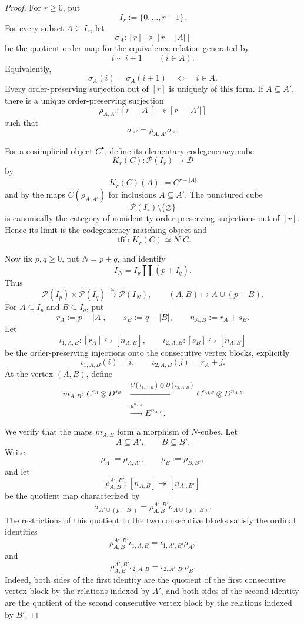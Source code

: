 \begin{proof}
For \(r\geq0\), put
\[
    I_r:=\{0,\ldots,r-1\}.
\]
For every subset \(A\subseteq I_r\), let
\[
    \sigma_A:[r]\twoheadrightarrow[r-|A|]
\]
be the quotient order map for the equivalence relation generated by
\[
    i\sim i+1
    \qquad(i\in A).
\]
Equivalently,
\[
    \sigma_A(i)=\sigma_A(i+1)
    \quad\Longleftrightarrow\quad
    i\in A.
\]
Every order-preserving surjection out of \([r]\) is uniquely of this form.
If \(A\subseteq A'\), there is a unique order-preserving surjection
\[
    \rho_{A,A'}:
    [r-|A|]\twoheadrightarrow[r-|A'|]
\]
such that
\[
\boxed{
    \sigma_{A'}
    =
    \rho_{A,A'}\sigma_A.
}
\]

For a cosimplicial object \(C^\bullet\), define its elementary codegeneracy
cube
\[
    K_r(C):\mathcal P(I_r)\longrightarrow\mathcal D
\]
by
\[
    K_r(C)(A):=C^{r-|A|}
\]
and by the maps \(C(\rho_{A,A'})\) for inclusions \(A\subseteq A'\).
The punctured cube
\[
    \mathcal P(I_r)\setminus\{\varnothing\}
\]
is canonically the category of nonidentity order-preserving surjections out of
\([r]\).  Hence its limit is the codegeneracy matching object and
\[
\boxed{
    \operatorname{tfib}K_r(C)
    \simeq
    N^rC.
}
\]

Now fix \(p,q\geq0\), put \(N=p+q\), and identify
\[
    I_N
    =
    I_p\amalg(p+I_q).
\]
Thus
\[
    \mathcal P(I_p)\times\mathcal P(I_q)
    \xrightarrow{\simeq}
    \mathcal P(I_N),
    \qquad
    (A,B)\longmapsto A\cup(p+B).
\]
For \(A\subseteq I_p\) and \(B\subseteq I_q\), put
\[
    r_A:=p-|A|,
    \qquad
    s_B:=q-|B|,
    \qquad
    n_{A,B}:=r_A+s_B.
\]
Let
\[
    \iota_{1,A,B}:[r_A]\hookrightarrow[n_{A,B}],
    \qquad
    \iota_{2,A,B}:[s_B]\hookrightarrow[n_{A,B}]
\]
be the order-preserving injections onto the consecutive vertex blocks,
explicitly
\[
    \iota_{1,A,B}(i)=i,
    \qquad
    \iota_{2,A,B}(j)=r_A+j.
\]
At the vertex \((A,B)\), define
\[
\begin{aligned}
    m_{A,B}:\,
    C^{r_A}\otimes D^{s_B}
    &\xrightarrow{
        C(\iota_{1,A,B})
        \otimes
        D(\iota_{2,A,B})
    }
    C^{n_{A,B}}\otimes D^{n_{A,B}}
    \\
    &\xrightarrow{\mu^{n_{A,B}}}
    E^{n_{A,B}}.
\end{aligned}
\]

We verify that the maps \(m_{A,B}\) form a morphism of \(N\)-cubes.  Let
\[
    A\subseteq A',
    \qquad
    B\subseteq B'.
\]
Write
\[
    \rho_A:=\rho_{A,A'},
    \qquad
    \rho_B:=\rho_{B,B'},
\]
and let
\[
    \rho_{A,B}^{A',B'}:
    [n_{A,B}]
    \twoheadrightarrow
    [n_{A',B'}]
\]
be the quotient map characterized by
\[
    \sigma_{A'\cup(p+B')}
    =
    \rho_{A,B}^{A',B'}
    \sigma_{A\cup(p+B)}.
\]
The restrictions of this quotient to the two consecutive blocks satisfy the
ordinal identities
\[
\boxed{
    \rho_{A,B}^{A',B'}\iota_{1,A,B}
    =
    \iota_{1,A',B'}\rho_A,
}
\]
and
\[
\boxed{
    \rho_{A,B}^{A',B'}\iota_{2,A,B}
    =
    \iota_{2,A',B'}\rho_B.
}
\]
Indeed, both sides of the first identity are the quotient of the first
consecutive vertex block by the relations indexed by \(A'\), and both sides
of the second identity are the quotient of the second consecutive vertex
block by the relations indexed by \(B'\).


\end{proof}
